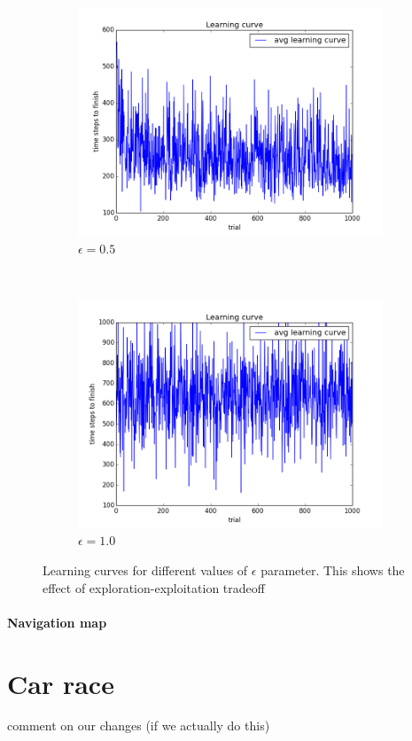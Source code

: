 \begin{figure}[h!]
\begin{subfigure}[b]{0.4\textwidth}
    \includegraphics[width=\textwidth]{figures/epsilon_5_learning_curve.png}
    \caption{\label{fig:eps5}$\epsilon = 0.5$}
\end{subfigure}
~
\begin{subfigure}[b]{0.4\textwidth}
    \includegraphics[width=\textwidth]{figures/epsilon_10_learning_curve.png}
    \caption{\label{fig:eps10}$\epsilon = 1.0$}
\end{subfigure}
\caption{\label{fig:eps}Learning curves for different values of $\epsilon$
parameter. This shows the effect of exploration-exploitation tradeoff}
\end{figure}
 



\paragraph{Navigation map}


\section{Car race}
comment on our changes (if we actually do this)
